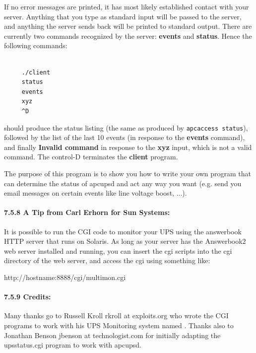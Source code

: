 If no error messages are printed, it has most likely established contact with
your server. Anything that you type as standard input will be passed to the
server, and anything the server sends back will be printed to standard output.
There are currently two commands recognized by the server: {\bf events} and
{\bf status}.  Hence the following commands: 

\footnotesize
\begin{verbatim}
     
     ./client
     status
     events
     xyz
     ^D
\end{verbatim}
\normalsize

should produce the status listing (the same as produced by {\tt apcaccess
status}), followed by the list of the last 10 events (in response to the {\bf
events} command), and finally {\bf Invalid command} in response to the {\bf
xyz} input, which is not a valid command. The control-D terminates the {\bf
client} program.  

The purpose of this program is to show you how to write your own program that
can determine the status of apcupsd and act any way you want (e.g. send you
email messages on certain events like line voltage boost, ...). 

\label{A-Tip-from-Carl-Erhorn-for-Sun-Systems}

\paragraph*{7.5.8 A Tip from Carl Erhorn for Sun Systems:}

\label{index-Tip-137}
It is possible to run the CGI code to monitor your UPS using the answerbook
HTTP server that runs on Solaris. As long as your server has the Answerbook2
web server installed and running, you can insert the cgi scripts into the cgi
directory of the web server, and access the cgi using something like:  

http://hostname:8888/cgi/multimon.cgi 

\label{Credits}

\paragraph*{7.5.9 Credits:}

Many thanks go to Russell Kroll \lt{}rkroll at exploits.org\gt{} who wrote the
CGI programs to work with his UPS Monitoring system named 
. Thanks also to
Jonathan Benson \lt{}jbenson at technologist.com\gt{} for initially adapting
the upsstatus.cgi program to work with apcupsd.  

